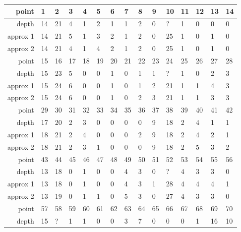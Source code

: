 \begin{center}
  \tablefirsthead{\hline}
  \tablelasttail{\hline}
  \begin{supertabular}{|r|l l l l l l l l l l l l l l|}
point & 1 & 2 & 3 & 4 & 5 & 6 & 7 & 8 & 9 & 10 & 11 & 12 & 13 & 14 \\
\hline
depth & 14 & 21 & 4 & 1 & 2 & 1 & 1 & 2 & 0 & ? & 1 & 0 & 0 & 0 \\
approx 1 & 14 & 21 & 5 & 1 & 3 & 2 & 1 & 2 & 0 & 25 & 1 & 0 & 1 & 0 \\
approx 2 & 14 & 21 & 4 & 1 & 4 & 2 & 1 & 2 & 0 & 25 & 1 & 0 & 1 & 0 \\
\hline
point & 15 & 16 & 17 & 18 & 19 & 20 & 21 & 22 & 23 & 24 & 25 & 26 & 27 & 28 \\
\hline
depth & 15 & 23 & 5 & 0 & 0 & 1 & 0 & 1 & 1 & ? & 1 & 0 & 2 & 3 \\
approx 1 & 15 & 24 & 6 & 0 & 0 & 1 & 0 & 1 & 2 & 21 & 1 & 1 & 4 & 3 \\
approx 2 & 15 & 24 & 6 & 0 & 0 & 1 & 0 & 2 & 3 & 21 & 1 & 1 & 3 & 3 \\
\hline
point & 29 & 30 & 31 & 32 & 33 & 34 & 35 & 36 & 37 & 38 & 39 & 40 & 41 & 42 \\
\hline
depth & 17 & 20 & 2 & 3 & 0 & 0 & 0 & 0 & 9 & 18 & 2 & 4 & 1 & 1 \\
approx 1 & 18 & 21 & 2 & 4 & 0 & 0 & 0 & 2 & 9 & 18 & 2 & 4 & 2 & 1 \\
approx 2 & 18 & 21 & 2 & 3 & 1 & 0 & 0 & 0 & 9 & 18 & 2 & 5 & 3 & 2 \\
\hline
point & 43 & 44 & 45 & 46 & 47 & 48 & 49 & 50 & 51 & 52 & 53 & 54 & 55 & 56 \\
\hline
depth & 13 & 18 & 0 & 1 & 0 & 0 & 4 & 3 & 0 & ? & 4 & 3 & 3 & 0 \\
approx 1 & 13 & 18 & 0 & 1 & 0 & 0 & 4 & 3 & 1 & 28 & 4 & 4 & 4 & 1 \\
approx 2 & 13 & 19 & 0 & 1 & 1 & 0 & 5 & 3 & 0 & 27 & 4 & 3 & 3 & 0 \\
\hline
point & 57 & 58 & 59 & 60 & 61 & 62 & 63 & 64 & 65 & 66 & 67 & 68 & 69 & 70 \\
\hline
depth & 15 & ? & 1 & 1 & 0 & 0 & 3 & 7 & 0 & 0 & 0 & 1 & 16 & 10 \\

\end{supertabular}
\end{center}
